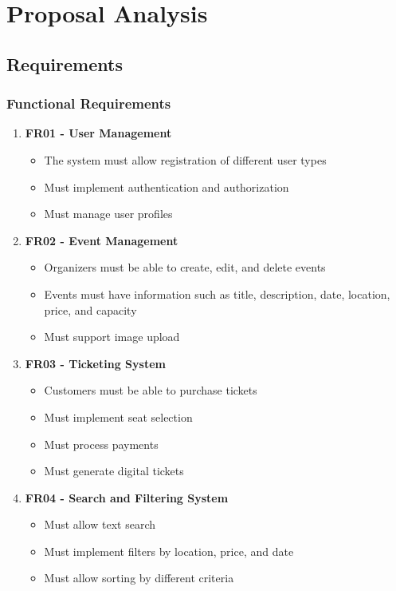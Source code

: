 \documentclass[12pt,a4paper]{article}
\begin{document}
\section{Proposal Analysis}

\subsection{Requirements}

\subsubsection{Functional Requirements}
\begin{enumerate}
    \item \textbf{FR01 - User Management}
    \begin{itemize}
        \item The system must allow registration of different user types
        \item Must implement authentication and authorization
        \item Must manage user profiles
    \end{itemize}
    
    \item \textbf{FR02 - Event Management}
    \begin{itemize}
        \item Organizers must be able to create, edit, and delete events
        \item Events must have information such as title, description, date, location, price, and capacity
        \item Must support image upload
    \end{itemize}
    
    \item \textbf{FR03 - Ticketing System}
    \begin{itemize}
        \item Customers must be able to purchase tickets
        \item Must implement seat selection
        \item Must process payments
        \item Must generate digital tickets
    \end{itemize}
    
    \item \textbf{FR04 - Search and Filtering System}
    \begin{itemize}
        \item Must allow text search
        \item Must implement filters by location, price, and date
        \item Must allow sorting by different criteria
    \end{itemize}
    

\end{enumerate}
\end{document}
